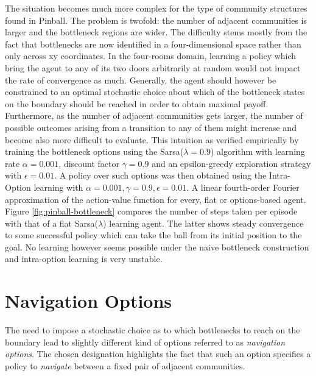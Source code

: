 \documentclass[12pt, oneside, extrafontsizes]{memoir}  %
\theoremstyle{plain}
\theoremstyle{definition}
\begin{document}
The situation becomes much more complex for the type of community structures found in Pinball. The problem is twofold: the number of adjacent communities is larger and the bottleneck regions are wider. The difficulty stems mostly from the fact that bottlenecks are now identified in a four-dimensional space rather than only across xy coordinates. In the four-rooms domain, learning a policy which bring the agent to any of its two doors arbitrarily at random would not impact the rate of convergence as much. Generally, the agent should however be constrained to an optimal stochastic choice about which of the bottleneck states on the boundary should be reached in order to obtain maximal payoff. Furthermore, as the number of adjacent communities gets larger, the number of possible outcomes arising from a transition to any of them might increase and become also more difficult to evaluate. This intuition as verified empirically by training the bottleneck options using the Sarsa($\lambda = 0.9$) algorithm with learning rate $\alpha = 0.001$, discount factor $\gamma = 0.9$ and an epsilon-greedy exploration strategy with $\epsilon = 0.01$. A policy over such options was then obtained using the Intra-Option learning with $\alpha = 0.001, \gamma = 0.9, \epsilon = 0.01$. A linear fourth-order Fourier approximation of the action-value function for every, flat or options-based agent. Figure \ref{fig:pinball-bottleneck} compares the number of steps taken per episode with that of a flat Sarsa($\lambda$) learning agent. The latter shows steady convergence to some successful policy which can take the ball from its initial position to the goal. No learning however seems possible under the naive bottleneck construction and intra-option learning is very unstable. 

\section{Navigation Options}

The need to impose a stochastic choice as to which bottlenecks to reach on the boundary lead to slightly different kind of options referred to as \textit{navigation options}. The chosen designation highlights the fact that such an option specifies a policy to \textit{navigate} between a fixed pair of adjacent communities.
\end{document}
